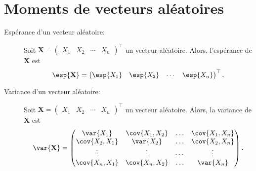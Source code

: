 \section{Moments de vecteurs aléatoires}
\label{sec:elements:moments}
\begin{description}
\item[Espérance d'un vecteur aléatoire:] Soit $\mathbf{X}=\begin{pmatrix}X_1& X_2 & \cdots & X_n\end{pmatrix}^{\top}$ un vecteur aléatoire. Alors, l'espérance de $\mathbf{X}$ est 
$$
\esp{\mathbf{X}}=\begin{pmatrix} \esp{X_1}& \esp{X_2} & \cdots & \esp{X_n}\end{pmatrix}^{\top}.
$$
\item[Variance d'un vecteur aléatoire:] Soit $\mathbf{X}=\begin{pmatrix}X_1& X_2 & \cdots & X_n\end{pmatrix}^{\top}$ un vecteur aléatoire. Alors, la variance de $\mathbf{X}$ est 
$$
\var{\mathbf{X}}=\begin{pmatrix} \var{X_1}& \cov{X_1,X_2} & \ldots & \cov{X_1,X_n} \\ \cov{X_2,X_1} & \var{X_2} & \ldots &  \cov{X_2,X_n} \\ \vdots & \vdots & \cdots & \vdots\\ \cov{X_n,X_1} & \cov{X_n,X_2}&\ldots&\var{X_n}\end{pmatrix}.
$$
\end{description}

